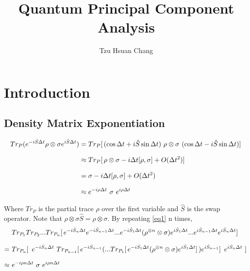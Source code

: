 \documentclass[a4paper]{article}
\title{Quantum Principal Component Analysis}
\author{Tzu Hsuan Chang}
\begin{document}
\maketitle

\section{Introduction}
\label{sec:Intro}


\subsection*{Density Matrix Exponentiation}
\label{subsec:dme}
    \begin{equation} \label{eq1}
    \setlength{\jot}{10pt}
    \begin{aligned}
        Tr_P ( e^{-i \hat{S} \Delta t} \rho  \otimes \sigma e^{i \hat{S} \Delta t} )
            &= Tr_P [ \, ( \cos \Delta t + i \hat{S} \sin \Delta t ) \ \rho \otimes \sigma \ ( \cos \Delta t - i \hat{S} \sin \Delta t ) ] \, \\
            &\approx Tr_P [ \, \rho \otimes \sigma - i \Delta t [\rho, \sigma] + O(\Delta t^2) ] \, \\
            &= \sigma - i \Delta t [\rho, \sigma] + O (\Delta t^2) \\
            &\approx e^{-i \rho \Delta t} \ \sigma \ e^{i \rho \Delta t}
    \end{aligned}
    \end{equation}


Where $Tr_P$ is the partial trace $\rho$ over the first variable and $\hat{S}$ is the swap operator. Note that $\rho \otimes \sigma \hat{S} = \rho \otimes \sigma$. By repeating \eqref{eq1} n times,
    \begin{equation} \label{eq2}
    \setlength{\jot}{10pt}
    \begin{aligned}
        &Tr_{P_1} Tr_{P_2} ... Tr_{P_n} [ \, e^{-i \hat{S}_n \Delta t} e^{-i \hat{S}_{n-1} \Delta t} ... e^{-i \hat{S}_1 \Delta t} ( \rho^{\otimes n}  \otimes \sigma ) e^{i \hat{S}_1 \Delta t} ... e^{i \hat{S}_{n-1} \Delta t} e^{i \hat{S}_n \Delta t} ] \, \\
        = \ &Tr_{P_n} [ \, \ 
            e^{-i \hat{S}_n \Delta t} \ 
            Tr_{P_{n-1}} [\, 
            e^{-i \hat{S}_{n-1}}
                (... Tr_{P_1} [ \, e^{-i \hat{S}_1 \Delta t} ( \rho^{\otimes n}  \otimes \sigma ) e^{i \hat{S}_1 \Delta t} ] \,)  
                    e^{i \hat{S}_{n-1}}
                ] \, \
                e^{i \hat{S}_n \Delta t} \ 
        ] \, \\
        \approx \ &e^{-i \rho n \Delta t} \ \sigma \ e^{i \rho n \Delta t}
    \end{aligned}
    \end{equation}
\end{document}

